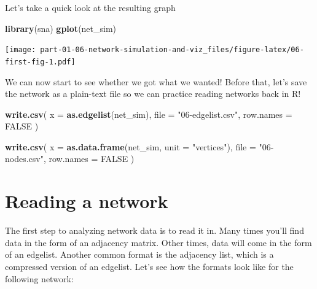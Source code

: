 \documentclass[]{book}
\newenvironment{Shaded}{\begin{snugshade}}{\end{snugshade}}
\newcommand{\DataTypeTok}[1]{\textcolor[rgb]{0.13,0.29,0.53}{#1}}
\newcommand{\KeywordTok}[1]{\textcolor[rgb]{0.13,0.29,0.53}{\textbf{#1}}}
\newcommand{\NormalTok}[1]{#1}
\newcommand{\OtherTok}[1]{\textcolor[rgb]{0.56,0.35,0.01}{#1}}
\newcommand{\StringTok}[1]{\textcolor[rgb]{0.31,0.60,0.02}{#1}}
\begin{document}
Let's take a quick look at the resulting graph

\begin{Shaded}
\begin{Highlighting}[]
\KeywordTok{library}\NormalTok{(sna)}
\KeywordTok{gplot}\NormalTok{(net_sim)}
\end{Highlighting}
\end{Shaded}

\texttt{[image: part-01-06-network-simulation-and-viz\_files/figure-latex/06-first-fig-1.pdf]}

We can now start to see whether we got what we wanted! Before that, let's save the
network as a plain-text file so we can practice reading networks back in R!

\begin{Shaded}
\begin{Highlighting}[]
\KeywordTok{write.csv}\NormalTok{(}
  \DataTypeTok{x         =} \KeywordTok{as.edgelist}\NormalTok{(net_sim),}
  \DataTypeTok{file      =} \StringTok{"06-edgelist.csv"}\NormalTok{,}
  \DataTypeTok{row.names =} \OtherTok{FALSE}
\NormalTok{  )}

\KeywordTok{write.csv}\NormalTok{(}
  \DataTypeTok{x         =} \KeywordTok{as.data.frame}\NormalTok{(net_sim, }\DataTypeTok{unit =} \StringTok{"vertices"}\NormalTok{),}
  \DataTypeTok{file      =} \StringTok{"06-nodes.csv"}\NormalTok{,}
  \DataTypeTok{row.names =} \OtherTok{FALSE}
\NormalTok{  )}
\end{Highlighting}
\end{Shaded}

\hypertarget{reading-a-network}{%
\section{Reading a network}\label{reading-a-network}}

The first step to analyzing network data is to read it in. Many times you'll find
data in the form of an adjacency matrix. Other times, data will come in the form
of an edgelist. Another common format is the adjacency list, which is a compressed
version of an edgelist. Let's see how the formats look like for the following
network:
\end{document}

